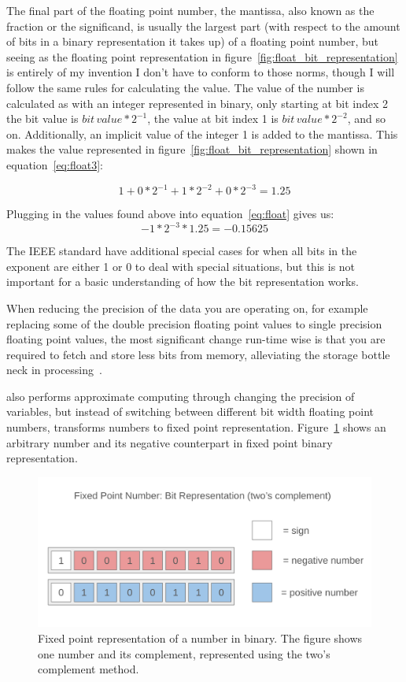 The final part of the floating point number, the mantissa, also known as the fraction or the significand, is usually the largest part (with respect to the amount of bits in a binary representation it takes up) of a floating point number, but seeing as the floating point representation in figure~\ref{fig:float_bit_representation} is entirely of my invention I don't have to conform to those norms, though I will follow the same rules for calculating the value.
The value of the number is calculated as with an integer represented in binary, only starting at bit index 2 the bit value is $bit\,value*2^{-1}$, the value at bit index 1 is $bit\,value*2^{-2}$, and so on. Additionally, an implicit value of the integer 1 is added to the mantissa. This makes the value represented in figure~\ref{fig:float_bit_representation} shown in equation~\ref{eq:float3}:

\begin{equation}\label{eq:float3}
   1 + 0*2^{-1} + 1*2^{-2} + 0*2^{-3} = 1.25
\end{equation}

Plugging in the values found above into equation~\ref{eq:float} gives us:
\begin{equation}\label{eq:float4}
-1 * 2^{-3} * 1.25 = -0.15625
\end{equation}

The IEEE standard have additional special cases for when all bits in the exponent are either 1 or 0 to deal with special situations, but this is not important for a basic understanding of how the bit representation works.

When reducing the precision of the data you are operating on, for example replacing some of the double precision floating point values to single precision floating point values, the most significant change run-time wise is that you are required to fetch and store less bits from memory, alleviating the storage bottle neck in processing~\citep{floatsmith_paper}.

\taffo{} also performs approximate computing through changing the precision of variables, but instead of switching between different bit width floating point numbers, \taffo{} transforms numbers to fixed point representation. Figure~\ref{fig:fixed_point_representation} shows an arbitrary number and its negative counterpart in fixed point binary representation.

\begin{figure}
    \centering
    \includegraphics[width=0.5\linewidth]{Images/fixed_point_bit_representation.png}
    \caption{Fixed point representation of a number in binary. The figure shows one number and its complement, represented using the two's complement method.}
    \label{fig:fixed_point_representation}
\end{figure}

